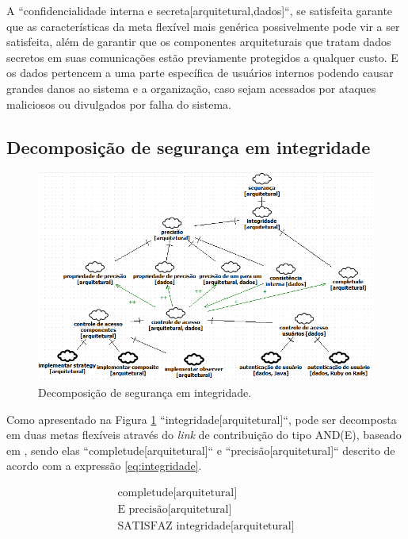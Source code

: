 A ``confidencialidade interna e secreta[arquitetural,dados]``, se satisfeita garante que as características da meta flexível mais genérica possivelmente pode vir a ser satisfeita, além de garantir que os componentes arquiteturais que tratam dados secretos em suas comunicações estão previamente protegidos a qualquer custo. E os dados pertencem a uma parte específica de usuários internos podendo causar grandes danos ao sistema e a organização, caso sejam acessados por ataques maliciosos ou divulgados por falha do sistema. 

\newpage

\subsection{Decomposição de segurança em integridade}
\label{sub:DecomposicaoDeSegurancaEmIntegridade}

\begin{figure}[h!]
	\centering
	\includegraphics[keepaspectratio=true,scale=0.9]{figuras/SIG-Integridade.PNG}
	\caption{Decomposição de segurança em integridade.}
	\label{DecomposicaoIntegridade}
\end{figure}

Como apresentado na Figura \ref{DecomposicaoIntegridade} ``integridade[arquitetural]``, pode ser decomposta em duas metas flexíveis através do \textit{link} de contribuição do tipo AND(E), baseado em \cite{chung2012non}, sendo elas ``completude[arquitetural]`` e ``precisão[arquitetural]`` descrito de acordo com a expressão \ref{eq:integridade}.

\begin{eqnarray}
\label{eq:integridade}
\textrm{completude[arquitetural]} \nonumber\\
\textrm{E precisão[arquitetural]} \nonumber\\
\textrm{SATISFAZ integridade[arquitetural]}
\end{eqnarray}  

